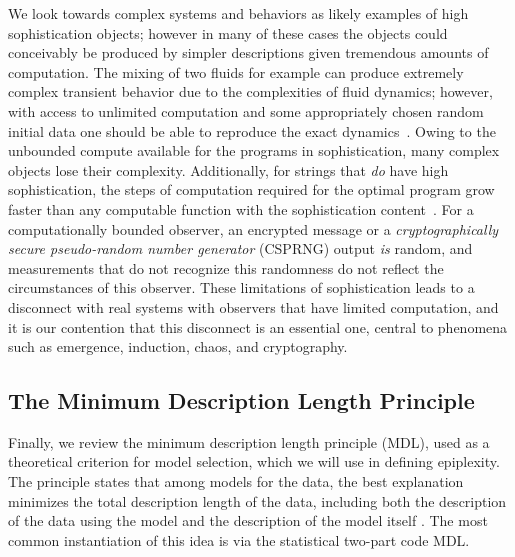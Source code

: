 \documentclass[twoside]{article}
\begin{document}
We look towards complex systems and behaviors as likely examples of high sophistication objects; however in many of these cases the objects could conceivably be produced by simpler descriptions given tremendous amounts of computation. The mixing of two fluids for example can produce extremely complex transient behavior due to the complexities of fluid dynamics; however, with access to unlimited computation and some appropriately chosen random initial data one should be able to reproduce the exact dynamics~\citep{aaronson2014quantifying}.
Owing to the unbounded compute available for the programs in sophistication, many complex objects lose their complexity. Additionally, for strings that \emph{do} have high sophistication, the steps of computation required for the optimal program grow faster than any computable function with the sophistication content~\citep{ay2010effective}.
For a computationally bounded observer, an encrypted message or a \emph{cryptographically secure pseudo-random number generator} (CSPRNG) output \emph{is} random, and measurements that do not recognize this randomness do not reflect the circumstances of this observer. 
These limitations of sophistication leads to a disconnect with real systems with observers that have limited computation, and it is our contention that this disconnect is an essential one, central to phenomena such as emergence, induction, chaos, and cryptography. %

%
%

%
%
%
%
%


%

%
%
%
%
%
%
%

%
%
%
%
%

%
%
%
%

%
%
%
%
%
%
%
\subsection{The Minimum Description Length Principle}
%

%
%
%
%
%

%
%
%
%
%
%
%

Finally, we review the minimum description length principle (MDL), used as a theoretical criterion for model selection, which we will use in defining epiplexity. The principle states that among models for the data, the best explanation minimizes the total description length of the data, including both the description of the data using the model and the description of the model itself \citep{rissanen2004minimum}. The most common instantiation of this idea is via the statistical two-part code MDL.
%
\end{document}
